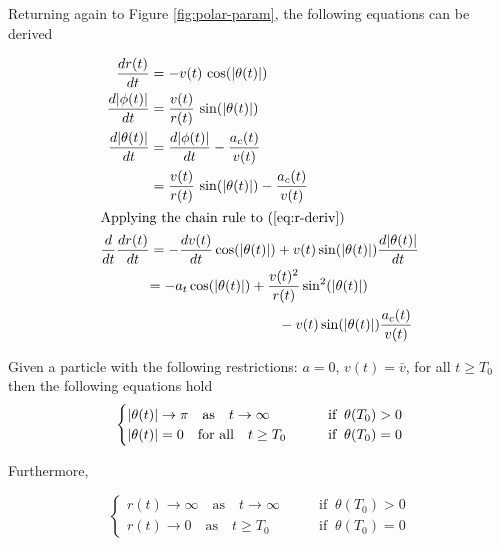 Returning again to Figure \ref{fig:polar-param}, the following equations can be derived

\begin{align}
  \frac{dr(t)}{dt}& = -v(t) \, \cos\paren{\abs{\theta(t)}}\label{eq:r-deriv}\\
  \frac{d\abs{\phi(t)}}{dt}& = \frac{v(t)}{r(t)} \, \sin\paren{\abs{\theta(t)}}\label{eq:phi-deriv}\\
  \frac{d\abs{\theta(t)}}{dt}& = \frac{d\abs{\phi(t)}}{dt} - \frac{a_c(t)}{v(t)}\\
  &= \frac{v(t)}{r(t)} \, \sin\paren{\abs{\theta(t)}} - \frac{a_c(t)}{v(t)}\label{eq:theta-deriv}\\
  \intertext{Applying the chain rule to (\ref{eq:r-deriv})}
  \frac{d}{dt} \frac{dr(t)}{dt}& = -\frac{dv(t)}{dt} \cos\paren{\abs{\theta(t)}} + v(t) \sin\paren{\abs{\theta(t)}} \frac{d\abs{\theta(t)}}{dt}\\
  &\begin{aligned}
    = -a_t \cos\paren{\abs{\theta(t)}} &+ \frac{v(t)^2}{r(t)} \sin^2\paren{\abs{\theta(t)}}\\
    &\qquad - v(t) \sin\paren{\abs{\theta(t)}} \frac{a_c(t)}{v(t)}\label{eq:r-deriv-2}
  \end{aligned}
\end{align}

\begin{lemma}\label{lemma:polar-assymptote}
  Given a particle with the following restrictions: $a = 0$, $v(t) = \bar{v}$, for all $t \ge T_0$then the following equations hold
  \[
    \begin{cases}
      \abs{\theta(t)} \to \pi \quad \text{as} \quad t \to \infty \qquad &\text{if} \;\; \theta(T_0) > 0\\
      \abs{\theta(t)} = 0 \quad \text{for all} \quad t \ge T_0 \qquad &\text{if} \;\; \theta(T_0) = 0
    \end{cases}
  \]

    Furthermore,

  \[
    \begin{cases}
      r(t) \to \infty \quad \text{as} \quad t \to \infty \qquad &\text{if} \;\; \theta(T_0) > 0\\
      r(t) \to 0 \quad \text{as} \quad t \ge T_0 \qquad &\text{if} \;\; \theta(T_0) = 0
    \end{cases}
  \]
\end{lemma}

